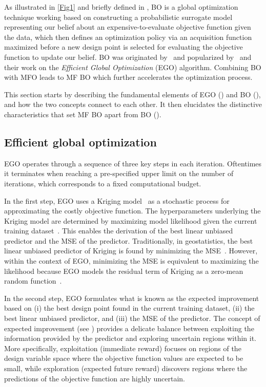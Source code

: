 \documentclass[iicol,sn-basic]{sn-jnl}%
\newcommand{\edit}[1]{\textcolor{red}{#1}} %
\begin{document}
As illustrated in \cref{Fig1} and briefly defined in , BO is a global optimization technique working based on constructing a probabilistic surrogate model %
{representing our belief about an expensive-to-evaluate objective function given the data, which then defines an optimization policy via an acquisition function maximized} before a new design point is selected for evaluating the objective function %
{to update our belief}.
BO was originated by~\cite{Mockus1975} and popularized by~\cite{Jones1998} and their work on the \textit{Efficient Global Optimization} (EGO) algorithm.
Combining BO with MFO leads to MF BO which further accelerates the optimization process.
 
This section starts by describing the fundamental elements of EGO () and BO (), and how the two concepts connect to each other.
It then elucidates the distinctive characteristics that set MF BO apart from BO ().

\subsection{Efficient global optimization}\label{Sec31}

EGO operates through a sequence of three key steps in each iteration.
Oftentimes it terminates when reaching a pre-specified upper limit on the number of iterations,
which corresponds to a fixed computational budget. 

In the first step, EGO uses a Kriging model~\citep{Sacks1989,Chiles1999}
as a stochastic process for approximating the costly objective function.
The hyperparameters underlying the Kriging model are determined by maximizing
{model likelihood given} the current training dataset~\citep{Jones1998}.
This enables the derivation of the best linear unbiased predictor and the MSE of the predictor.
Traditionally, in geostatistics, the best linear unbiased predictor of Kriging is found by
minimizing the MSE~\citep{Sacks1989,Chiles1999,Kleijnen2009}. 
However, within the context of EGO, minimizing the MSE is equivalent to maximizing the likelihood
because EGO models the residual term of Kriging as a zero-mean random function~\citep{Jones1998}.

In the second step, EGO formulates what is known as the expected improvement based on (i) the best design point found in the current training dataset, (ii) the best linear unbiased predictor, and (iii) the MSE of the predictor.
The concept of expected improvement (see ) provides a delicate balance between exploiting the information provided by the predictor and exploring uncertain regions within it.
{More specifically, exploitation (immediate reward) focuses on regions of the design variable space where the objective function values are expected to be small, while exploration (expected future reward) discovers regions where the predictions of the objective function are highly uncertain.} 
\end{document}
